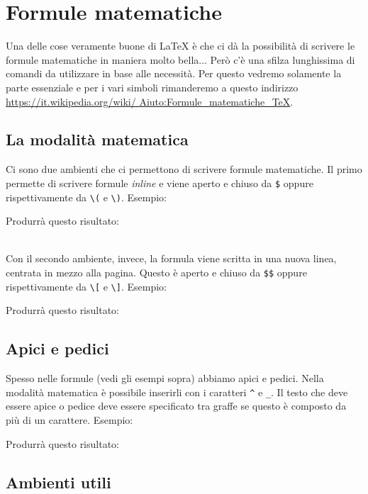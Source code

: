 \chapter{Formule matematiche}
Una delle cose veramente buone di \LaTeX{} è che ci dà la possibilità di 
scrivere le formule matematiche in maniera molto bella... Però c'è una sfilza 
lunghissima di comandi da utilizzare in base alle necessità. Per questo 
vedremo solamente la parte essenziale e per i vari simboli rimanderemo a 
questo indirizzo \url{https://it.wikipedia.org/wiki/
Aiuto:Formule_matematiche_TeX}.

\section{La modalità matematica}
Ci sono due ambienti che ci permettono di scrivere formule matematiche. Il 
primo permette di scrivere formule \textit{inline} e viene aperto e chiuso da 
\verb!$! oppure rispettivamente da \verb!\(! e \verb!\)!. Esempio:

Produrrà questo risultato:\\

\\ \par
Con il secondo ambiente, invece, la formula viene scritta in una nuova linea, 
centrata in mezzo alla pagina. Questo è aperto e chiuso da \verb!$$! oppure 
rispettivamente da \verb!\[! e \verb!\]!. Esempio:

Produrrà questo risultato:\\


\section{Apici e pedici}
Spesso nelle formule (vedi gli esempi sopra) abbiamo apici e pedici. Nella 
modalità matematica è possibile inserirli con i caratteri \verb!^! e \verb!_!. 
Il testo che deve essere apice o pedice deve essere specificato tra graffe se 
questo è composto da più di un carattere. Esempio:

Produrrà questo risultato:\\


\section{Ambienti utili}

